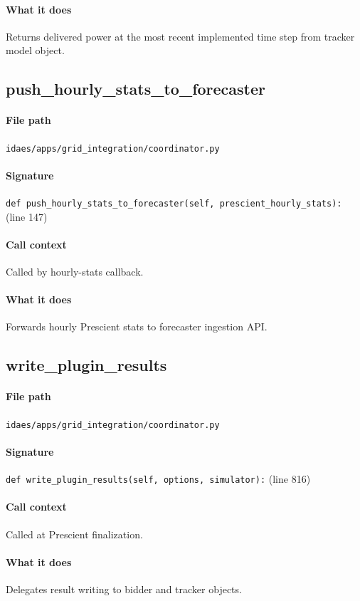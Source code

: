 \documentclass{article}
\begin{document}
\paragraph{What it does} Returns delivered power at the most recent implemented time step from tracker model object.

\subsection{push\_hourly\_stats\_to\_forecaster}\label{fn:push_hourly_stats_to_forecaster}
\paragraph{File path} \texttt{idaes/apps/grid\_integration/coordinator.py}
\paragraph{Signature} \texttt{def push\_hourly\_stats\_to\_forecaster(self, prescient\_hourly\_stats):} (line 147)
\paragraph{Call context} Called by hourly-stats callback.
\paragraph{What it does} Forwards hourly Prescient stats to forecaster ingestion API.

\subsection{write\_plugin\_results}\label{fn:write_plugin_results}
\paragraph{File path} \texttt{idaes/apps/grid\_integration/coordinator.py}
\paragraph{Signature} \texttt{def write\_plugin\_results(self, options, simulator):} (line 816)
\paragraph{Call context} Called at Prescient finalization.
\paragraph{What it does} Delegates result writing to bidder and tracker objects.
\end{document}
